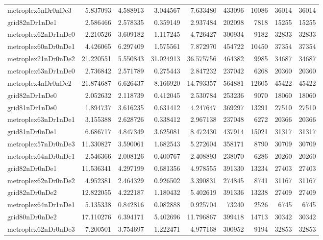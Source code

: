 \begin{longtable}{|l|r|r|r|r|r|r|r|r|}
metroplex5nDr0nDe3 & 5.837093 & 4.588913 & 3.044567 & 7.633480 & 433096 & 10086 & 36014 & 36014 \\
grid82nDr1nDe1 & 2.586466 & 2.578335 & 0.359149 & 2.937484 & 202098 & 7818 & 15255 & 15255 \\
metroplex62nDr1nDe0 & 2.210526 & 3.609182 & 1.117245 & 4.726427 & 300934 & 9182 & 32833 & 32833 \\
metroplex60nDr0nDe1 & 4.426065 & 6.297409 & 1.575561 & 7.872970 & 454722 & 10450 & 37354 & 37354 \\
metroplex21nDr0nDe2 & 21.220551 & 5.550843 & 31.024913 & 36.575756 & 464382 & 9985 & 34687 & 34687 \\
metroplex63nDr1nDe0 & 2.736842 & 2.571789 & 0.275443 & 2.847232 & 237042 & 6268 & 20360 & 20360 \\
metroplex4nDr0nDe2 & 21.874687 & 6.626437 & 8.166920 & 14.793357 & 564881 & 12605 & 45422 & 45422 \\
grid82nDr1nDe0 & 2.052632 & 2.118739 & 0.412045 & 2.530784 & 253236 & 9070 & 18060 & 18060 \\
grid81nDr1nDe0 & 1.894737 & 3.616235 & 0.631412 & 4.247647 & 369297 & 13291 & 27510 & 27510 \\
metroplex63nDr1nDe1 & 3.155388 & 2.628726 & 0.338412 & 2.967138 & 237048 & 6272 & 20366 & 20366 \\
grid81nDr0nDe1 & 6.686717 & 4.847349 & 3.625081 & 8.472430 & 437914 & 15021 & 31317 & 31317 \\
metroplex57nDr0nDe3 & 11.330827 & 3.590061 & 1.682543 & 5.272604 & 358171 & 8790 & 30709 & 30709 \\
metroplex64nDr0nDe1 & 2.546366 & 2.008126 & 0.400767 & 2.408893 & 238070 & 6286 & 20260 & 20260 \\
grid82nDr0nDe1 & 11.536341 & 4.297199 & 0.681356 & 4.978555 & 391330 & 13234 & 27403 & 27403 \\
metroplex62nDr0nDe2 & 4.952381 & 2.464329 & 0.926502 & 3.390831 & 274845 & 8741 & 31167 & 31167 \\
grid82nDr0nDe2 & 12.822055 & 4.222187 & 1.180432 & 5.402619 & 391336 & 13238 & 27409 & 27409 \\
metroplex64nDr1nDe1 & 5.135338 & 0.842816 & 0.082888 & 0.925704 & 73240 & 2526 & 6745 & 6745 \\
grid80nDr0nDe2 & 17.110276 & 6.394171 & 5.402696 & 11.796867 & 399418 & 14713 & 30342 & 30342 \\
metroplex62nDr0nDe3 & 7.200501 & 3.754697 & 1.222471 & 4.977168 & 300952 & 9194 & 32853 & 32853 \\

\end{longtable}
